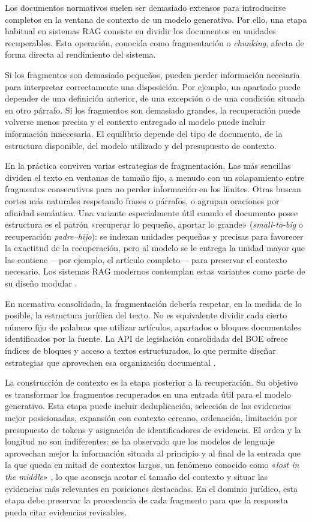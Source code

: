 Los documentos normativos suelen ser demasiado extensos para introducirse completos en la ventana de contexto de un modelo generativo. Por ello, una etapa habitual en sistemas RAG consiste en dividir los documentos en unidades recuperables. Esta operación, conocida como fragmentación o \emph{chunking}, afecta de forma directa al rendimiento del sistema.

Si los fragmentos son demasiado pequeños, pueden perder información necesaria para interpretar correctamente una disposición. Por ejemplo, un apartado puede depender de una definición anterior, de una excepción o de una condición situada en otro párrafo. Si los fragmentos son demasiado grandes, la recuperación puede volverse menos precisa y el contexto entregado al modelo puede incluir información innecesaria. El equilibrio depende del tipo de documento, de la estructura disponible, del modelo utilizado y del presupuesto de contexto.

En la práctica conviven varias estrategias de fragmentación. Las más sencillas dividen el texto en ventanas de tamaño fijo, a menudo con un solapamiento entre fragmentos consecutivos para no perder información en los límites. Otras buscan cortes más naturales respetando frases o párrafos, o agrupan oraciones por afinidad semántica. Una variante especialmente útil cuando el documento posee estructura es el patrón «recuperar lo pequeño, aportar lo grande» (\emph{small-to-big} o recuperación \emph{padre--hijo}): se indexan unidades pequeñas y precisas para favorecer la exactitud de la recuperación, pero al modelo se le entrega la unidad mayor que las contiene —por ejemplo, el artículo completo— para preservar el contexto necesario. Los sistemas RAG modernos contemplan estas variantes como parte de su diseño modular \cite{gao2023ragSurvey}.

En normativa consolidada, la fragmentación debería respetar, en la medida de lo posible, la estructura jurídica del texto. No es equivalente dividir cada cierto número fijo de palabras que utilizar artículos, apartados o bloques documentales identificados por la fuente. La API de legislación consolidada del BOE ofrece índices de bloques y acceso a textos estructurados, lo que permite diseñar estrategias que aprovechen esa organización documental \cite{boeApiConsolidada}.

La construcción de contexto es la etapa posterior a la recuperación. Su objetivo es transformar los fragmentos recuperados en una entrada útil para el modelo generativo. Esta etapa puede incluir deduplicación, selección de las evidencias mejor posicionadas, expansión con contexto cercano, ordenación, limitación por presupuesto de tokens y asignación de identificadores de evidencia. El orden y la longitud no son indiferentes: se ha observado que los modelos de lenguaje aprovechan mejor la información situada al principio y al final de la entrada que la que queda en mitad de contextos largos, un fenómeno conocido como «\emph{lost in the middle}» \cite{liu2024lostmiddle}, lo que aconseja acotar el tamaño del contexto y situar las evidencias más relevantes en posiciones destacadas. En el dominio jurídico, esta etapa debe preservar la procedencia de cada fragmento para que la respuesta pueda citar evidencias revisables.

